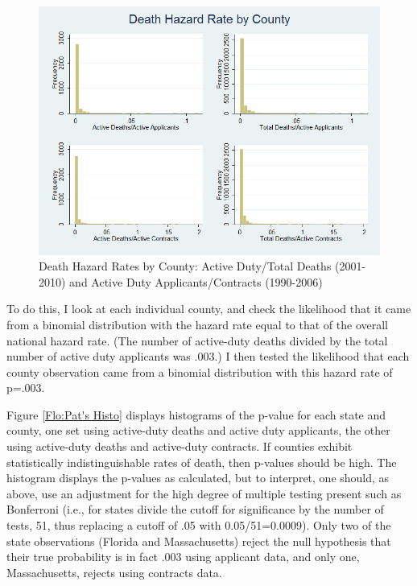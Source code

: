 \documentclass[12pt] {article}
\begin{document}
\begin{figure}
\includegraphics[scale=0.5]{../Output/hist_county_combined.png}
\caption{Death Hazard Rates by County: Active Duty/Total Deaths (2001-2010) and Active Duty Applicants/Contracts (1990-2006)}
\label{Flo:HISTOcountydeaths}
\end{figure}

To do this, I look at each individual county, and check the likelihood that it came from a binomial distribution with the hazard rate equal to that of the overall national hazard rate. (The number of active-duty deaths divided by the total number
of active duty applicants was .003.) I then tested the likelihood
that each county observation came from a binomial distribution with this
hazard rate of p=.003. 

Figure \ref{Flo:Pat's Histo} displays
histograms of the p-value for each state and county, one set using active-duty deaths
and active duty applicants, the other using active-duty deaths and
active-duty contracts. If counties exhibit statistically indistinguishable rates of death, then p-values should be high. The histogram displays the p-values as calculated,
but to interpret, one should, as above, use an adjustment for the high degree of multiple testing present such as Bonferroni (i.e., for states divide the cutoff for significance by the number of tests, 51, thus replacing a cutoff of .05 with 0.05/51=0.0009). Only two
of the state observations (Florida and Massachusetts) reject the null
hypothesis that their true probability is in fact .003 using applicant
data, and only one, Massachusetts, rejects using contracts data. 
\end{document}
